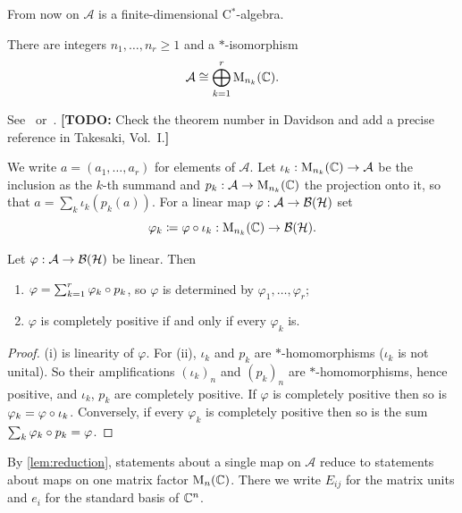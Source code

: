 \documentclass[12pt]{article}
\newcommand{\todo}[1]{\textcolor{\mysubcolor}{\small\textbf{[TODO:} #1\textbf{]}}}
\newcommand{\alg}{\mathcal{A}}             %
\newcommand{\hilb}{\mathcal{H}}            %
\newcommand{\bdd}[1]{\mathcal{B}\br{#1}}   %
\begin{document}
From now on \(\alg\) is a finite-dimensional C\(^*\)-algebra.

\begin{theorem}
\label{thm:structure}
There are integers \(n_1, \dots, n_r \ge 1\) and a \(*\)-isomorphism
\[
  \alg \cong \bigoplus_{k=1}^r \mathrm{M}_{n_k}(\complex).
\]
\end{theorem}
See~\cite[Theorem~III.1.1]{Davidson1996} or~\cite{Takesaki1979}.
\todo{Check the theorem number in Davidson and add a precise reference in
Takesaki, Vol.~I.}

We write \(a = (a_1, \dots, a_r)\) for elements of \(\alg\). Let
\(\iota_k : \mathrm{M}_{n_k}(\complex) \to \alg\) be the inclusion as the \(k\)-th
summand and \(p_k : \alg \to \mathrm{M}_{n_k}(\complex)\) the projection onto it,
so that \(a = \sum_k \iota_k(p_k(a))\). For a linear map
\(\varphi : \alg \to \bdd{\hilb}\) set
\[
  \varphi_k \eqdef \varphi \compose \iota_k : \mathrm{M}_{n_k}(\complex) \to \bdd{\hilb}.
\]

\begin{lemma}
\label{lem:reduction}
Let \(\varphi : \alg \to \bdd{\hilb}\) be linear. Then
\begin{enumerate}[label=(\roman*)]
  \item \(\varphi = \sum_{k=1}^r \varphi_k \circ p_k\), so \(\varphi\) is
    determined by \(\varphi_1, \dots, \varphi_r\);
  \item \(\varphi\) is completely positive if and only if every \(\varphi_k\) is.
\end{enumerate}
\end{lemma}
\begin{proof}
(i) is linearity of \(\varphi\). For (ii), \(\iota_k\) and \(p_k\) are
\(*\)-homomorphisms (\(\iota_k\) is not unital). So their amplifications
\((\iota_k)_n\) and \((p_k)_n\) are \(*\)-homomorphisms, hence positive, and
\(\iota_k\), \(p_k\) are completely positive. If \(\varphi\) is completely positive
then so is \(\varphi_k = \varphi \circ \iota_k\). Conversely, if every
\(\varphi_k\) is completely positive then so is the sum
\(\sum_k \varphi_k \circ p_k = \varphi\).
\end{proof}

By \cref{lem:reduction}, statements about a single map on \(\alg\) reduce to
statements about maps on one matrix factor \(\mathrm{M}_n({\mathbb C})\). There we
write \(E_{ij}\) for the matrix units and \(e_i\) for the standard basis of
\({\mathbb C}^n\).
\end{document}
